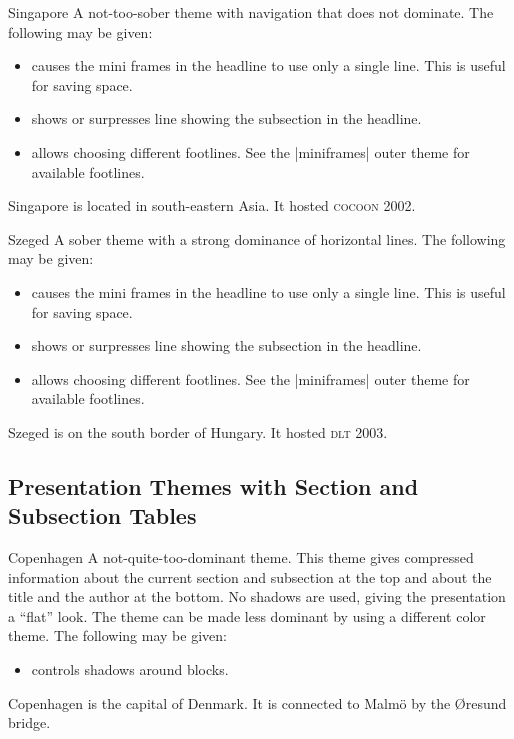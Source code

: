 \begin{themeexample}{Singapore}
  A not-too-sober theme with navigation that does not dominate. The following  may be given:
  \begin{itemize}
  \item {} causes the mini frames in the headline to use only a single line. This is useful for saving space.
  \item {} shows or surpresses line showing the subsection in the headline.
  \item {} allows choosing different footlines. See the |miniframes| outer theme for available footlines.
  \end{itemize}

  Singapore is located in south-eastern Asia. It hosted \textsc{cocoon} 2002.
\end{themeexample}

\begin{themeexample}{Szeged}
  A sober theme with a strong dominance of horizontal lines. The following  may be given:
  \begin{itemize}
  \item {} causes the mini frames in the headline to use only a single line. This is useful for saving space.
  \item {} shows or surpresses line showing the subsection in the headline.
  \item {} allows choosing different footlines. See the |miniframes| outer theme for available footlines.
  \end{itemize}

  Szeged is on the south border of Hungary. It hosted \textsc{dlt} 2003.
\end{themeexample}


\subsection{Presentation Themes with Section and Subsection Tables}

\begin{themeexample}{Copenhagen}
  A not-quite-too-dominant theme. This theme gives compressed information about the current section and subsection at the top and about the title and the author at the bottom. No shadows are used, giving the presentation a ``flat'' look. The theme can be made less dominant by using a different color theme. The following  may be given:
  \begin{itemize}
  \item {} controls shadows around blocks.
  \end{itemize}

  Copenhagen is the capital of Denmark. It is connected to Malm\"o by the \O resund bridge.
\end{themeexample}

